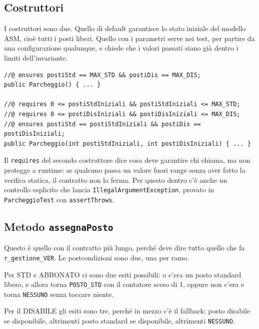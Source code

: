 \subsection{Costruttori}

I costruttori sono due. Quello di default garantisce lo stato iniziale del modello ASM,
cioè tutti i posti liberi. Quello con i parametri serve nei test, per partire da una
configurazione qualunque, e chiede che i valori passati siano già dentro i limiti
dell'invariante.

\begin{lstlisting}[style=terminal, caption={Contratti dei costruttori}]
//@ ensures postiStd == MAX_STD && postiDis == MAX_DIS;
public Parcheggio() { ... }

//@ requires 0 <= postiStdIniziali && postiStdIniziali <= MAX_STD;
//@ requires 0 <= postiDisIniziali && postiDisIniziali <= MAX_DIS;
//@ ensures postiStd == postiStdIniziali && postiDis == postiDisIniziali;
public Parcheggio(int postiStdIniziali, int postiDisIniziali) { ... }
\end{lstlisting}

Il \texttt{requires} del secondo costruttore dice cosa deve garantire chi chiama, ma non
protegge a runtime: se qualcuno passa un valore fuori range senza aver fatto la verifica
statica, il contratto non lo ferma. Per questo dentro c'è anche un controllo esplicito
che lancia \texttt{IllegalArgumentException}, provato in \texttt{ParcheggioTest} con
\texttt{assertThrows}.

\subsection{Metodo \texttt{assegnaPosto}}

Questo è quello con il contratto più lungo, perché deve dire tutto quello che fa
\texttt{r\_gestione\_VER}. Le postcondizioni sono due, una per ramo.

Per STD e ABBONATO ci sono due esiti possibili: o c'era un posto standard libero, e
allora torna \texttt{POSTO\_STD} con il contatore sceso di 1, oppure non c'era e torna
\texttt{NESSUNO} senza toccare niente.

Per il DISABILE gli esiti sono tre, perché in mezzo c'è il fallback: posto disabile se
disponibile, altrimenti posto standard se disponibile, altrimenti \texttt{NESSUNO}.

